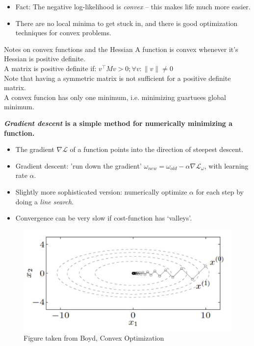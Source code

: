 \begin{itemize}
\item  Fact: The negative log-likelihood is \emph{convex} -- this makes life much more easier. 
\item  There are no local minima to get stuck in, and there is good optimization techniques for convex problems. 
\end{itemize}

\begin{bbbox}{Notes on convex functions and the Hessian}
	A function is convex whenever it's Hessian is positive definite.\\
	A matrix is positive definite if: $v^{\top} M v > 0; \forall v: \|v\| \not= 0$ \\
	Note that having a symmetric matrix is not sufficient for a positive definite matrix. \\
	A convex funcion has only one minimum, i.e. minimizing guartuees global minimum.
\end{bbbox}

\textbf{\emph{Gradient descent} is a simple method for numerically minimizing a function.}
\begin{itemize}
\item The gradient $\nabla \mathcal{L}$ of a function points into the direction of steepest descent.
\item  Gradient descent: 'run down the gradient' $\omega_{new}=\omega_{old}-\alpha \nabla \mathcal{L}_\omega$, with learning rate $\alpha$.
\item  Slightly more sophisticated version: numerically optimize $\alpha$ for each step by doing a \emph{line search}.
\item  Convergence can be very slow if cost-function has `valleys'.
\end{itemize}

\begin{figure}
\centering
\includegraphics[width=.7\textwidth]{./lecture7/BoydGradientDescent}
\caption{Figure taken from Boyd, Convex Optimization}
\end{figure}

